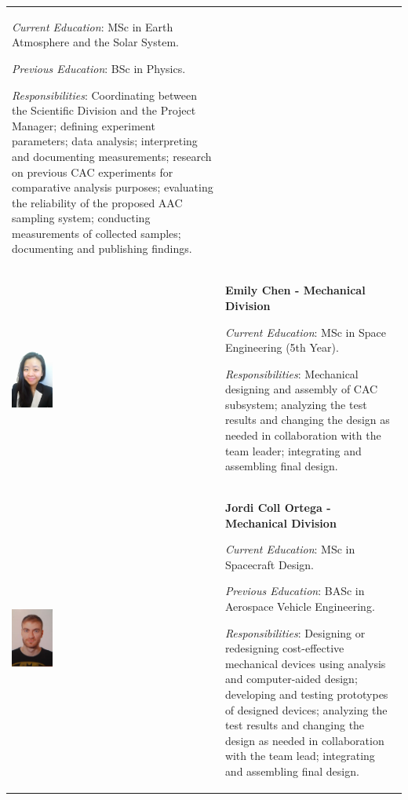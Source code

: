 \documentclass[a4paper,12pt,oneside]{article}
\begin{document}
\begin{longtable}[]{m{} m{}}
\smallskip
\textit{Current Education}: MSc in Earth Atmosphere and the Solar System.

\smallskip
\textit{Previous Education}: BSc in Physics.


\smallskip
\textit{Responsibilities}: Coordinating between the Scientific Division and the Project Manager; defining experiment parameters; data analysis; interpreting and documenting measurements; research on previous CAC experiments for comparative analysis purposes; evaluating the reliability of the proposed AAC sampling system; conducting measurements of collected samples; documenting and publishing findings. 
\bigskip
\\

\includegraphics[width=0.2\textwidth]{1-introduction/img/emily-chen.jpeg} & \textbf{Emily Chen - Mechanical Division}

\smallskip
\textit{Current Education}: MSc in Space Engineering (5th Year).


\smallskip
\textit{Responsibilities}: Mechanical designing and assembly of CAC subsystem; analyzing the test results and changing the design as needed in collaboration with the team leader; integrating and assembling final design. 
\bigskip
\\

\includegraphics[width=0.2\textwidth]{1-introduction/img/jordi-coll-ortega.jpg} & \textbf{Jordi Coll Ortega - Mechanical Division}

\smallskip
\textit{Current Education}: MSc in Spacecraft Design.

\smallskip
\textit{Previous Education}: BASc in Aerospace Vehicle Engineering.

\smallskip
\textit{Responsibilities}: Designing or redesigning cost-effective mechanical devices using analysis and computer-aided design; developing and testing prototypes of designed devices; analyzing the test results and changing the design as needed in collaboration with the team lead; integrating and assembling final design.
\bigskip
\\


\end{longtable}
\end{document}
